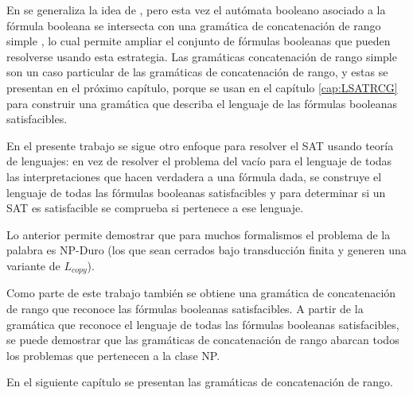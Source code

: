 En \cite{aSRCSAT} se generaliza la idea de \cite{aCFSAT}, pero esta vez el autómata booleano asociado a la fórmula booleana se intersecta con una gramática de concatenación de rango simple \cite{mainRCGBib}, lo cual permite ampliar el conjunto de fórmulas booleanas que pueden resolverse usando esta estrategia. Las gramáticas concatenación de rango simple son un caso particular de las gramáticas de concatenación de rango, y estas se presentan en el próximo capítulo, porque se usan en el capítulo \ref{cap:LSATRCG} para construir una gramática que 
describa el lenguaje de las fórmulas booleanas satisfacibles.

En el presente trabajo se sigue otro enfoque para resolver el SAT usando teoría de lenguajes: en vez de resolver el problema del vacío para el lenguaje de todas las interpretaciones que hacen verdadera a una fórmula dada, se construye el lenguaje de todas las fórmulas booleanas satisfacibles y para determinar si un SAT es satisfacible se comprueba si pertenece a ese lenguaje.

Lo anterior permite demostrar que para muchos formalismos el problema de la palabra es NP-Duro (los que sean cerrados bajo transducción finita y generen una variante de $L_{copy}$).

Como parte de este trabajo también se obtiene una gramática de concatenación de rango que reconoce las fórmulas booleanas satisfacibles. A partir de la gramática que reconoce el lenguaje de todas las fórmulas booleanas satisfacibles, se puede demostrar que las gramáticas de concatenación de rango abarcan todos los problemas que pertenecen a la clase NP.

En el siguiente capítulo se presentan las gramáticas de concatenación de rango.
